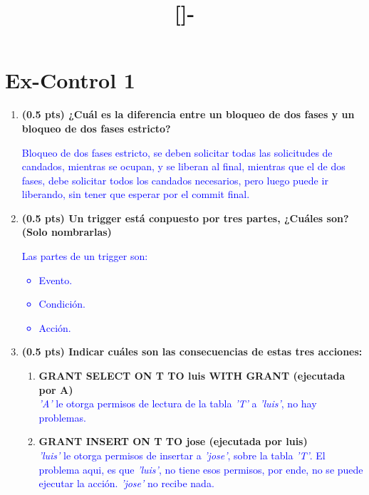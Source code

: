 \documentclass{templateNote}
\begin{document}

\title{[\asignatura]-\titulo}
\author{
    \autor
}
\portada
\margenes %
\section{Ex-Control 1}
\begin{enumerate}
    \item \textbf{(0.5 pts) ¿Cuál es la diferencia entre un bloqueo de dos fases y un bloqueo de dos fases estricto?}

    \textcolor{blue}{   
        Bloqueo de dos fases estricto, se deben solicitar todas las solicitudes de candados, mientras se ocupan, y se liberan al final, mientras que el de dos fases, debe solicitar todos los candados necesarios, pero luego puede ir liberando, sin tener que esperar por el commit final.
    }
    \item \textbf{(0.5 pts) Un trigger está conpuesto por tres partes, ¿Cuáles son? (Solo nombrarlas)}
    \\ \textcolor{blue}{
    Las partes de un trigger son:
    \begin{itemize}
        \item Evento.
        \item Condición.
        \item Acción.
    \end{itemize}
    }
    \item \textbf{(0.5 pts) Indicar cuáles son las consecuencias de estas tres acciones:}
    \begin{enumerate}
        \item \textbf{GRANT SELECT ON T TO luis WITH GRANT (ejecutada por A)}
        \\ \textcolor{blue}{\textit{'A'} le otorga permisos de lectura de la tabla \textit{'T'} a \textit{'luis'}, no hay problemas.}
        
        \item \textbf{GRANT INSERT ON T TO jose (ejecutada por luis)}
        \\ \textcolor{blue}{\textit{'luis'} le otorga permisos de insertar a \textit{'jose'}, sobre la tabla \textit{'T'}. El problema aqui, es que \textit{'luis'}, no tiene esos permisos, por ende, no se puede ejecutar la acción. \textit{'jose'} no recibe nada.}
        

\end{enumerate}
\end{enumerate}
\end{document}
